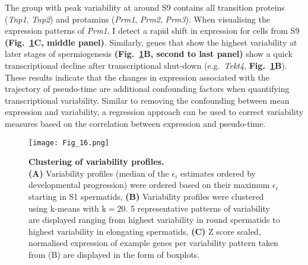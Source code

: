 The group with peak variability at around S9 contains all transition proteins (\textit{Tnp1}, \textit{Tnp2}) and protamins (\textit{Prm1}, \textit{Prm2}, \textit{Prm3}). 
When visualising the expression patterns of \textit{Prm1}, I detect a rapid shift in expression for cells from S9 \textbf{(Fig.~\ref{fig3:variability_clustering}C, middle panel)}. 
Similarly, genes that show the highest variability at later stages of spermiogenesis \textbf{(Fig.~\ref{fig3:variability_clustering}B, second to last panel)} show a quick transcriptional decline after transcriptional shut-down (e.g.~\emph{Tekt4}, \textbf{Fig.~\ref{fig3:variability_clustering}B}). \\

These results indicate that the changes in expression associated with the trajectory of pseudo-time are additional confounding factors when quantifying transcriptional variability. 
Similar to removing the confounding between mean expression and variability, a regression approach can be used to correct variability measures based on the correlation between expression and pseudo-time. 

\newpage

\begin{figure}[!h]
\centering
\texttt{[image: Fig\_16.png]}
\caption[Clustering of variability profiles]{\textbf{Clustering of variability profiles.}\\
\textbf{(A)} Variability profiles (median of the $\epsilon_i$ estimates ordered by developmental progression) were ordered based on their maximum $\epsilon_i$ starting in S1 spermatids, 
\textbf{(B)} Variability profiles were clustered using k-means with $\text{k}=20$. 
5 representative patterns of variability are displayed ranging from highest variability in round spermatids to highest variability in elongating spermatids, 
\textbf{(C)} Z score scaled, normalised expression of example genes per variability pattern taken from (B) are displayed in the form of boxplots.}
\label{fig3:variability_clustering}
\end{figure}

